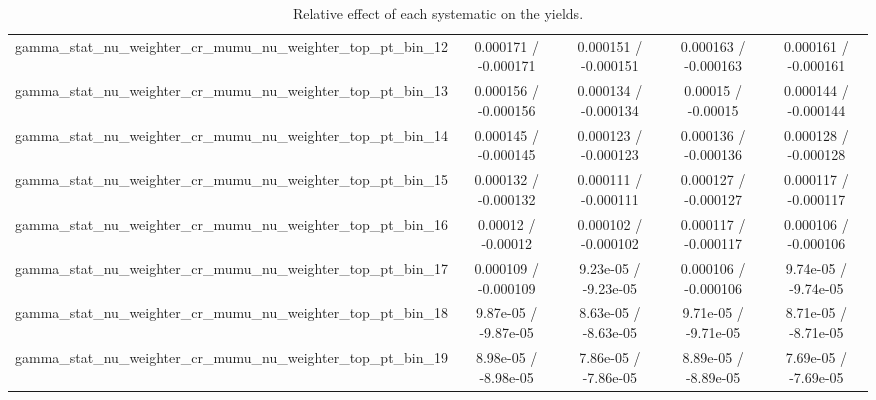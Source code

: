 \documentclass[10pt]{article}
\begin{document}
\begin{table}[htbp]
\begin{center}
\begin{tabular}{|c|c|c|c|c|}
  gamma_stat_nu_weighter_cr_mumu_nu_weighter_top_pt_bin_12 & 0.000171 / -0.000171 & 0.000151 / -0.000151 & 0.000163 / -0.000163 & 0.000161 / -0.000161 \\ 
  gamma_stat_nu_weighter_cr_mumu_nu_weighter_top_pt_bin_13 & 0.000156 / -0.000156 & 0.000134 / -0.000134 & 0.00015 / -0.00015 & 0.000144 / -0.000144 \\ 
  gamma_stat_nu_weighter_cr_mumu_nu_weighter_top_pt_bin_14 & 0.000145 / -0.000145 & 0.000123 / -0.000123 & 0.000136 / -0.000136 & 0.000128 / -0.000128 \\ 
  gamma_stat_nu_weighter_cr_mumu_nu_weighter_top_pt_bin_15 & 0.000132 / -0.000132 & 0.000111 / -0.000111 & 0.000127 / -0.000127 & 0.000117 / -0.000117 \\ 
  gamma_stat_nu_weighter_cr_mumu_nu_weighter_top_pt_bin_16 & 0.00012 / -0.00012 & 0.000102 / -0.000102 & 0.000117 / -0.000117 & 0.000106 / -0.000106 \\ 
  gamma_stat_nu_weighter_cr_mumu_nu_weighter_top_pt_bin_17 & 0.000109 / -0.000109 & 9.23e-05 / -9.23e-05 & 0.000106 / -0.000106 & 9.74e-05 / -9.74e-05 \\ 
  gamma_stat_nu_weighter_cr_mumu_nu_weighter_top_pt_bin_18 & 9.87e-05 / -9.87e-05 & 8.63e-05 / -8.63e-05 & 9.71e-05 / -9.71e-05 & 8.71e-05 / -8.71e-05 \\ 
  gamma_stat_nu_weighter_cr_mumu_nu_weighter_top_pt_bin_19 & 8.98e-05 / -8.98e-05 & 7.86e-05 / -7.86e-05 & 8.89e-05 / -8.89e-05 & 7.69e-05 / -7.69e-05 \\ 
\hline 
\end{tabular} 
\caption{Relative effect of each systematic on the yields.} 
\end{center} 
\end{table} 
\end{document}
